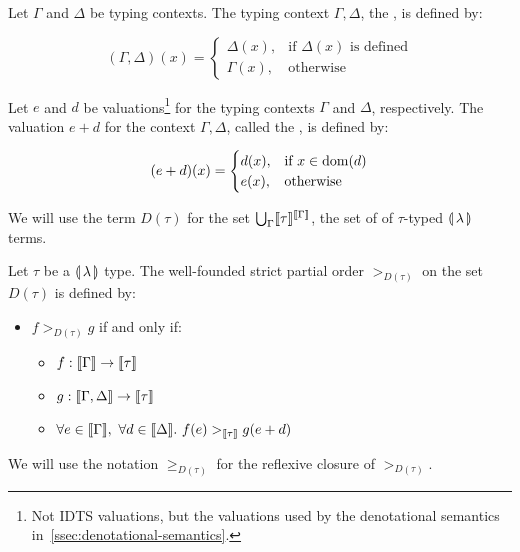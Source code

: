 \begin{notation}
  Let $\Gamma$ and $\Delta$ be typing contexts. The typing context $\Gamma,
  \Delta$, the , is defined by:

  $$
  (\Gamma,\Delta)(x) = \begin{cases}
    \Delta(x), & \text{if $\Delta(x)$ is defined} \\
    \Gamma(x), & \text{otherwise}
  \end{cases}
  $$
\end{notation}

\begin{notation}
  Let $e$ and $d$ be valuations\footnote{Not IDTS valuations, but the
    valuations used by the denotational semantics
    in~\ref{ssec:denotational-semantics}.} for the typing contexts $\Gamma$
  and $\Delta$, respectively. The valuation $e + d$ for the context
  $\Gamma, \Delta$, called the , is
  defined by:

  $$
  (e + d)(x) = \begin{cases}
    d(x), & \text{if $x \in \operatorname{dom}(d)$} \\
    e(x), & \text{otherwise}
  \end{cases}
  $$
\end{notation}

\begin{notation}
  We will use the term $D(\tau)$ for the set
  $\bigcup_\Gamma \llbracket \tau \rrbracket^{\llbracket \Gamma \rrbracket}$, the set of  of $\tau$-typed $\llparenthesis \, \lambda \, \rrparenthesis$ terms.
\end{notation}

\begin{definition}
  Let $\tau$ be a $\llparenthesis \, \lambda \, \rrparenthesis$ type. The well-founded strict partial
  order $>_{D(\tau)}$ on the set $D(\tau)$ is defined by:

  \begin{itemize}
  \item $f >_{D(\tau)} g$ if and only if:
    \begin{itemize}
    \item $f : \llbracket \Gamma \rrbracket \to \llbracket \tau \rrbracket$
    \item $g : \llbracket \Gamma,\Delta \rrbracket \to \llbracket \tau \rrbracket$
    \item $\forall e \in \llbracket \Gamma \rrbracket,\ \forall d \in \llbracket \Delta \rrbracket.\ f(e)
      >_{\llbracket \tau \rrbracket} g(e + d)$
    \end{itemize}
  \end{itemize}
  
  We will use the notation $\ge_{D(\tau)}$ for the reflexive closure of
  $>_{D(\tau)}$.
\end{definition}

